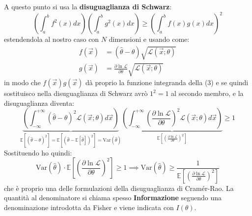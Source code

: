 \documentclass[openany,a4paper,12pt]{book}
\providecommand{\mathscr}[1]{\mathcal{#1}}
\theoremstyle{remark}
\begin{document}
A questo punto si usa la \textbf{disuguaglianza di Schwarz}:
\begin{equation}
    \left( \int_a^b f^2(x) dx \right) \left( \int_a^b g^2(x) dx \right) \geq \left( \int_a^b f(x)g(x) dx \right)^2
\end{equation}
estendendola al nostro caso con $N$ dimensioni e usando come:
\begin{align*}
    f(\vec{x}) &= (\hat{\theta} - \theta)\sqrt{\mathscr{L}(\vec{x}; \theta)} \\
    g(\vec{x}) &= \frac{\partial \ln \mathscr{L}}{\partial \theta}\sqrt{\mathscr{L}(\vec{x}; \theta)}
\end{align*}
in modo che $f(\vec{x})g(\vec{x})$ dà proprio la funzione integranda della (3) e se quindi sostituisco nella disuguaglianza di Schwarz avrò $1^2 = 1$ al secondo membro, e la disuguaglianza diventa:
\begin{equation}
    \underbrace{\left( \int_{-\infty}^{+\infty} (\hat{\theta} - \theta)^2 \mathscr{L}(\vec{x}; \theta) d\vec{x} \right)}_{\mathbb{E}[(\hat{\theta} - \theta)^2] = \mathbb{E}[(\hat{\theta} - \mathbb{E}[\hat{\theta}])^2] = \mathrm{Var}(\hat{\theta})}
    \underbrace{\left( \int_{-\infty}^{+\infty} \left( \frac{\partial \ln \mathscr{L}}{\partial \theta} \right)^2 \mathscr{L}(\vec{x}; \theta) d\vec{x} \right)}_{\mathbb{E}\left[ \left(\frac{\partial \ln \mathscr{L}}{\partial \theta}\right)^2 \right]}
    \geq 1
\end{equation}
Sostituendo ho quindi:
\begin{equation}
    \mathrm{Var}(\hat{\theta}) \cdot \mathbb{E}\left[ \left( \frac{\partial \ln \mathscr{L}}{\partial \theta} \right)^2 \right] \geq 1 \implies \mathrm{Var}(\hat{\theta}) \geq \frac{1}{\mathbb{E}\left[ \left( \frac{\partial \ln \mathscr{L}}{\partial \theta} \right)^2 \right]} \label{eq: MVB derivata prima}
\end{equation}
che è proprio una delle formulazioni della disuguaglianza di Cramér-Rao. La quantità al denominatore si chiama spesso \textbf{Informazione} seguendo una denominazione introdotta da Fisher e viene indicata con $I(\theta)$.
\end{document}
